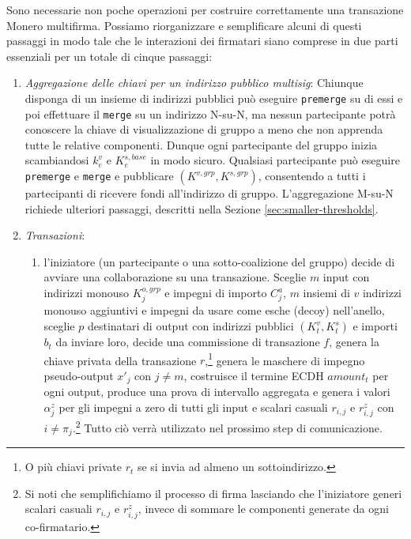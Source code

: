 Sono necessarie non poche operazioni per costruire correttamente una transazione Monero multifirma. Possiamo riorganizzare e semplificare alcuni di questi passaggi in modo tale che le interazioni dei firmatari siano comprese in due parti essenziali per un totale di cinque passaggi:
\begin{enumerate}
    \item \textit{Aggregazione delle chiavi per un indirizzo pubblico multisig}: Chiunque disponga di un insieme di indirizzi pubblici può eseguire {\tt premerge} su di essi e poi effettuare il {\tt merge} su un indirizzo N-su-N, ma nessun partecipante potrà conoscere la chiave di visualizzazione di gruppo a meno che non apprenda tutte le relative componenti. Dunque ogni partecipante del gruppo inizia scambiandosi $k^{v}_e$ e $K^{s,base}_e$ in modo sicuro. Qualsiasi partecipante può eseguire {\tt premerge} e {\tt merge} e pubblicare $(K^{v,grp},K^{s,grp})$, consentendo a tutti i partecipanti di ricevere fondi all'indirizzo di gruppo. L'aggregazione M-su-N richiede ulteriori passaggi, descritti nella Sezione \ref{sec:smaller-thresholds}.
    \item \textit{Transazioni}:
    \begin{enumerate}
        \item l'iniziatore (un partecipante o una sotto-coalizione del gruppo) decide di avviare una collaborazione su una transazione. Sceglie $m$ input con indirizzi monouso $K^{o,grp}_{j}$ e impegni di importo $C^a_j$, $m$ insiemi di $v$ indirizzi monouso aggiuntivi e impegni da usare come esche (decoy) nell'anello, sceglie $p$ destinatari di output con indirizzi pubblici $(K^v_t,K^s_t)$ e importi $b_t$ da inviare loro, decide una commissione di transazione $f$, genera la chiave privata della transazione $r$,\footnote{O più chiavi private $r_{t}$ se si invia ad almeno un sottoindirizzo.} genera le maschere di impegno pseudo-output $x'_{j}$ con $j \neq m$, costruisce il termine ECDH $\mathit{amount}_t$ per ogni output, produce una prova di intervallo aggregata e genera i valori $\alpha^z_j$ per gli impegni a zero di tutti gli input e scalari casuali $r_{i,j}$ e $r^z_{i,j}$ con $i \neq \pi_j$.\footnote{Si noti che semplifichiamo il processo di firma lasciando che l'iniziatore generi scalari casuali $r_{i,j}$ e $r^z_{i,j}$, invece di sommare le componenti generate da ogni co-firmatario.} Tutto ciò verrà utilizzato nel prossimo step di comunicazione.\\


\end{enumerate}
\end{enumerate}
